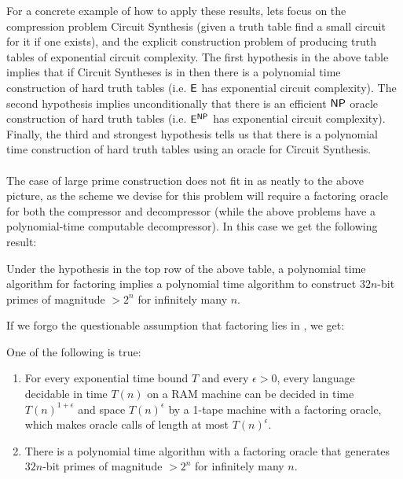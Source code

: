 For a concrete example of how to apply these results, lets focus on the compression problem {\sc Circuit Synthesis} (given a truth table find a small circuit for it if one exists), and the explicit construction problem of producing truth tables of exponential circuit complexity. The first hypothesis in the above table implies that if {\sc Circuit Syntheses} is in  then there is a polynomial time construction of hard truth tables (i.e. $\cl{E}$ has exponential circuit complexity). The second hypothesis implies unconditionally that there is an efficient $\cl{NP}$ oracle construction of hard truth tables (i.e. $\cl{E}^\cl{NP}$ has exponential circuit complexity). Finally, the third and strongest hypothesis tells us that there is a polynomial time construction of hard truth tables using an oracle for {\sc Circuit Synthesis}.
\\
\\
The case of large prime construction does not fit in as neatly to the above picture, as the scheme we devise for this problem will require a factoring oracle for both the compressor and decompressor (while the above problems have a polynomial-time computable decompressor). In this case we get the following result:
\begin{theorem*}
Under the hypothesis in the top row of the above table, a polynomial time algorithm for factoring implies a polynomial time algorithm to construct $32n$-bit primes of magnitude $>2^n$ for infinitely many $n$.
\end{theorem*}

If we forgo the questionable assumption that factoring lies in , we get:
\begin{theorem*}
One of the following is true:
\begin{enumerate}
    \item For every exponential time bound $T$ and every $\epsilon>0$, every language decidable in time $T(n)$ on a RAM machine can be decided in time $T(n)^{1+\epsilon}$ and space $T(n)^{\epsilon}$ by a 1-tape machine with a factoring oracle, which makes oracle calls of length at most $T(n)^{\epsilon}$.
    \item There is a polynomial time algorithm with a factoring oracle that generates $32n$-bit primes of magnitude $>2^n$ for infinitely many $n$.
\end{enumerate}
\end{theorem*}

